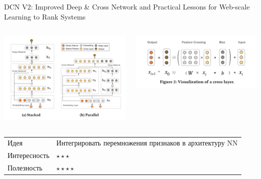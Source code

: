 \documentclass[11pt,aspectratio=169,handout]{beamer}
\begin{document}
\begin{frame}{DCN V2: Improved Deep \& Cross Network and Practical Lessons for Web-scale Learning to Rank Systems \cite{DCN}}

\begin{columns}
\begin{column}{0.45\textwidth} 
\begin{center}
\includegraphics[scale=0.3]{images/dcn-arch.png}
\end{center}
\end{column}
\begin{column}{0.45\textwidth}
\begin{center}
\includegraphics[scale=0.3]{images/dcn-block.png}
\end{center}
\end{column}
\end{columns}

\vfill
\begin{small}
\begin{tabular}{l l}
Идея & Интегрировать перемножения признаков в архитектуру NN \\
Интересность & $\star\star\star$ \\
Полезность & $\star\star\star\star$
\end{tabular}
\end{small}

\end{frame}
\end{document}
